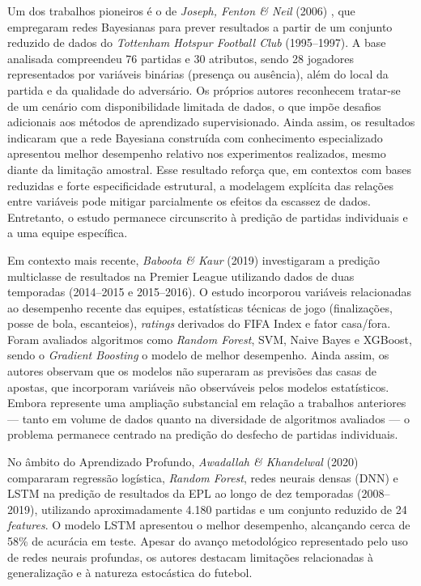 Um dos trabalhos pioneiros é o de \textit{Joseph, Fenton \& Neil} (2006) \cite{Joseph2006}, que empregaram redes Bayesianas para prever resultados a partir de um conjunto reduzido 
de dados do \textit{Tottenham Hotspur Football Club} (1995--1997). A base analisada compreendeu 76 partidas e 30 atributos, sendo 28 jogadores representados por variáveis binárias 
(presença ou ausência), além do local da partida e da qualidade do adversário. Os próprios autores reconhecem tratar-se de um cenário com disponibilidade limitada de dados, 
o que impõe desafios adicionais aos métodos de aprendizado supervisionado. Ainda assim, os resultados indicaram que a rede Bayesiana construída com conhecimento especializado 
apresentou melhor desempenho relativo nos experimentos realizados, mesmo diante da limitação amostral. Esse resultado reforça que, em contextos com bases reduzidas e 
forte especificidade estrutural, a modelagem explícita das relações entre variáveis pode mitigar parcialmente os efeitos da escassez de dados. 
Entretanto, o estudo permanece circunscrito à predição de partidas individuais e a uma equipe específica.

Em contexto mais recente, \textit{Baboota \& Kaur} (2019) \cite{Baboota2019} investigaram a predição multiclasse de resultados na Premier League utilizando dados de duas temporadas 
(2014--2015 e 2015--2016). O estudo incorporou variáveis relacionadas ao desempenho recente das equipes, estatísticas técnicas de jogo 
(finalizações, posse de bola, escanteios), \textit{ratings} derivados do FIFA Index e fator casa/fora. Foram avaliados algoritmos como \textit{Random Forest}, 
SVM, Naive Bayes e XGBoost, sendo o \textit{Gradient Boosting} o modelo de melhor desempenho. Ainda assim, os autores observam que os modelos não superaram as 
previsões das casas de apostas, que incorporam variáveis não observáveis pelos modelos estatísticos. Embora represente uma ampliação substancial em relação a trabalhos anteriores 
— tanto em volume de dados quanto na diversidade de algoritmos avaliados — o problema permanece centrado na predição do desfecho de partidas individuais.

No âmbito do Aprendizado Profundo, \textit{Awadallah \& Khandelwal} (2020) \cite{Awadallah2020} compararam regressão logística, \textit{Random Forest}, redes neurais densas (DNN) e LSTM 
na predição de resultados da EPL ao longo de dez temporadas (2008--2019), utilizando aproximadamente 4.180 partidas e um conjunto reduzido de 24 \textit{features}. 
O modelo LSTM apresentou o melhor desempenho, alcançando cerca de 58\% de acurácia em teste. Apesar do avanço metodológico representado pelo uso de redes neurais profundas, 
os autores destacam limitações relacionadas à generalização e à natureza estocástica do futebol.

